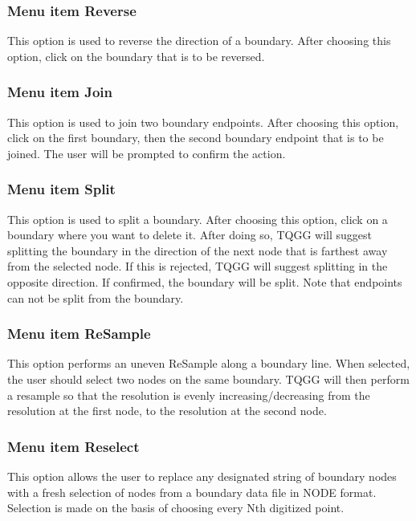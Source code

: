 \documentclass{article}
\begin{document}
\subsubsection[Menu item Reverse]{Menu item Reverse}
This option is used to reverse the direction of a boundary. After choosing this option, click on the boundary that is to be reversed.

\subsubsection[Menu item Join]{Menu item Join}
This option is used to join two boundary endpoints. After choosing this option, click on the first boundary, then the second boundary endpoint that is to be joined. The user will be prompted to confirm the action.

\subsubsection[Menu item Split]{Menu item Split}
This option is used to split a boundary. After choosing this option, click on a boundary where you want to delete it. After doing so, TQGG will suggest splitting the boundary in the direction of the next node that is farthest away from the selected node. If this is rejected, TQGG will suggest splitting in the opposite direction. If confirmed, the boundary will be split. Note that endpoints can not be split from the boundary.

\subsubsection[Menu item ReSample]{Menu item ReSample}
This option performs an uneven ReSample along a boundary line. When selected, the user should select two nodes on the same boundary. TQGG will then perform a resample so that the resolution is evenly increasing/decreasing from the resolution at the first node, to the resolution at the second node.

\subsubsection[Menu item Reselect]{Menu item Reselect}

This option allows the user to replace any designated string of boundary nodes with a fresh selection of nodes from a boundary data file in NODE format. Selection is made on the basis of choosing every Nth digitized point.
\end{document}
